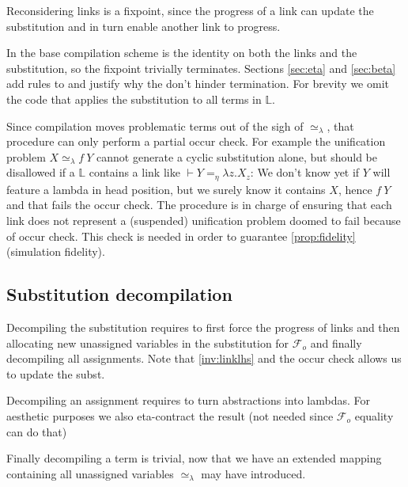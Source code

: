\documentclass[sigconf,natbib=false,review]{acmart}
\newcommand{\UnifRel}{\ensuremath{\simeq}}
\newcommand{\Ue}{\ensuremath{\UnifRel_\lambda}\xspace}
\newcommand{\Fo}{\ensuremath{\mathcal{F}_{\!o}\xspace}} %
\newcommand{\linketaM}[3]{\ensuremath{#1 \vdash #2 =_\eta #3}}
\newcommand{\linkStore}{\ensuremath{\mathbb{L}}\xspace}
\begin{document}
Reconsidering links is a fixpoint, since the progress of a link can update the
substitution and in turn enable another link to progress.



\noindent
In the base compilation scheme  is the identity
on both the links and the substitution, so the fixpoint trivially terminates.
Sections \ref{sec:eta} and \ref{sec:beta} add rules to 
and justify why the don't hinder termination. For brevity we omit the code
that applies the substitution  to all terms in \linkStore.

Since compilation moves problematic terms out of the sigh of \Ue{},
that procedure can only perform a partial occur check. For example the
unification problem $X \Ue f~Y$ cannot generate a cyclic substitution alone,
but should be disallowed if a $\linkStore$ contains a link like
$\linketaM{}{Y}{\lambda z.X_z}$: We don't know yet if $Y$ will feature
a lambda in head position, but we surely know it contains $X$, hence
$f~Y$ and that fails the occur check.
The procedure  is in charge of ensuring that
each link does not represent a (suspended) unification problem doomed
to fail because of occur check. This check is needed in order to
guarantee \cref{prop:fidelity} (simulation fidelity).

\subsection{Substitution decompilation}

Decompiling the substitution requires to first force the
progress of links and then allocating new unassigned variables
in the substitution for \Fo{} and finally decompiling all
assignments. Note that \cref{inv:linklhs} and the
occur check allows us to update the subst.





\noindent
Decompiling an assignment requires to turn abstractions into
lambdas. For aesthetic purposes we also eta-contract the result
(not needed since \Fo{} equality can do that)



\noindent
Finally decompiling a term is trivial, now that we have an extended
mapping containing all unassigned variables \Ue may have introduced.


\end{document}
